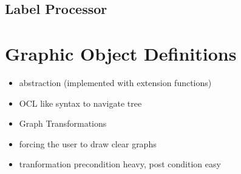 \subsection{Label Processor}


\section{Graphic Object Definitions}







   


\begin{itemize}
  \item abstraction (implemented with extension functions)
  \item OCL like syntax to navigate tree
  \item Graph Transformations 
  \item forcing the user to draw clear graphs
  \item tranformation precondition heavy, post condition easy
\end{itemize}